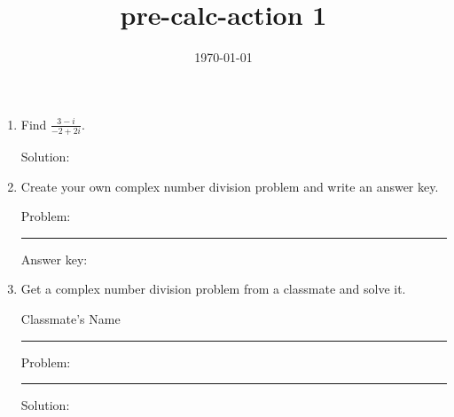 \documentclass[12pt]{article}
\title{pre-calc-action 1}
\author{}
\date{\today}
\begin{document}
\maketitle

\begin{enumerate}
    \item Find \(\displaystyle\frac{3-i}{-2+2i}\).

    Solution:
    \item Create your own complex number division problem and write an answer key.
    \vspace{1em}
    
    Problem: \rule{10em}{1px}

    Answer key:
    
    \item Get a complex number division problem from a classmate and solve it.
    \vspace{1em}
    
    Classmate's Name \rule{10em}{1px}
    \vspace{1em}
    
    Problem: \rule{10em}{1px}

    Solution:
\end{enumerate}
\end{document}
